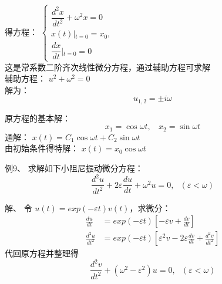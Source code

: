 \begin{frame}	
	得方程：
	$\displaystyle \begin{cases}
	\dfrac{d ^2 x}{d t^2} +\omega ^2 x = 0	\\
	x(t)\left |_{t=0}  =x_0  \right. , \\
	 \dfrac{dx}{dt} \left |_{t=0}  =0 \right.      	
	\end{cases}$\\
	这是常系数二阶齐次线性微分方程，通过辅助方程可求解\\ 
	辅助方程： $u^2+\omega ^2=0$ \\
	解为：
	\begin{equation*}
		u_{1, 2} =\pm i\omega     
	\end{equation*}
\end{frame}

\begin{frame}
	原方程的基本解： 
	\begin{equation*}
		x_{1} =\cos \omega t  , ~~~~	x_{2} =\sin \omega t     
	\end{equation*}
	通解： $x(t)=C_1 \cos \omega t +C_2 \sin \omega t $ \\  	\vspace{0.6cm}
	由初始条件得特解： $x(t)=x_0 \cos \omega t $ \\
\end{frame}

\begin{frame}
	\begin{exampleblock} {例9、	求解如下小阻尼振动微分方程：}
	\begin{equation*}
		\frac{d^2 u}{d t^2} +2\varepsilon \frac{d u}{dt} +\omega ^2 u = 0 ,  ~~~ (\varepsilon < \omega)   
	\end{equation*}
	\end{exampleblock} 
	\alert{解、} 令 $\displaystyle  u(t)= exp(-\varepsilon t) v(t) $，求微分：	
	\begin{align*}
		\frac{d u}{d t } & =exp(-\varepsilon t) [-\varepsilon v +\frac{d v}{dt}]\\
		\frac{d^2 u}{d t^2 } & =exp(-\varepsilon t) [\varepsilon ^2 v -2\varepsilon \frac{d v}{dt}+ \frac{d^2 v}{dt^2} ]
	\end{align*}
	代回原方程并整理得
	\begin{equation*}
		\frac{d^2 v}{d t^2} +(\omega ^2 - \varepsilon ^2) u = 0,  ~~~ (\varepsilon < \omega)   
	\end{equation*}
\end{frame}

